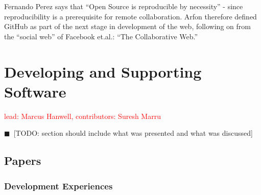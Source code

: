 \documentclass[11pt, oneside]{amsart}
\newcommand{\todo}[1]{{\color{blue}$\blacksquare$~\textsf{[TODO: #1]}}}
\newcommand{\note}[1]{ {\textcolor{red}    { #1 }}}
\begin{document}
Fernando Perez says that ``Open Source is reproducible by necessity''
- since reproducibility is a prerequisite for remote collaboration.
Arfon therefore defined GitHub as part of the next stage in
development of the web, following on from the ``social web'' of
Facebook et.al.: ``The Collaborative Web.''

\section{Developing and Supporting Software} \label{sec:devel}

\note{lead: Marcus Hanwell, contributors: Suresh Marru}

\todo{section should include what was presented and what was discussed}

\subsection{Papers}

\subsubsection*{Development Experiences}
\end{document}
